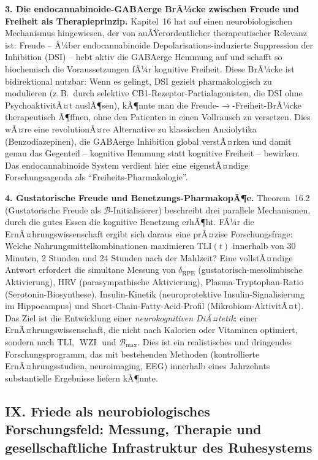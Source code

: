 ﻿\documentclass[12pt,a4paper]{report}
\theoremstyle{plain}
\theoremstyle{definition}
\theoremstyle{remark}
\DeclareMathOperator{\WZI}{WZI}
\begin{document}
	\textbf{3. Die endocannabinoide-GABAerge BrÃ¼cke zwischen Freude und Freiheit
		als Therapieprinzip.}
	Kapitel~16 hat auf einen neurobiologischen Mechanismus hingewiesen,
	der von auÃŸerordentlicher therapeutischer Relevanz ist:
	Freude -- Ã¼ber endocannabinoide Depolarisations-induzierte
	Suppression der Inhibition (DSI) -- hebt aktiv die GABAerge
	Hemmung auf und schafft so biochemisch die Voraussetzungen
	fÃ¼r kognitive Freiheit.
	Diese BrÃ¼cke ist bidirektional nutzbar: Wenn es gelingt, DSI
	gezielt pharmakologisch zu modulieren (z.\,B.\ durch selektive
	CB1-Rezeptor-Partialagonisten, die DSI ohne PsychoaktivitÃ¤t
	auslÃ¶sen), kÃ¶nnte man die Freude-$\to$-Freiheit-BrÃ¼cke
	therapeutisch Ã¶ffnen, ohne den Patienten in einen
	Vollrausch zu versetzen.
	Dies wÃ¤re eine revolutionÃ¤re Alternative zu klassischen Anxiolytika
	(Benzodiazepinen), die GABAerge Inhibition global verstÃ¤rken
	und damit genau das Gegenteil -- kognitive Hemmung statt
	kognitive Freiheit -- bewirken.
	Das endocannabinoide System verdient hier eine eigenstÃ¤ndige
	Forschungsagenda als ``Freiheits-Pharmakologie''.

	\textbf{4. Gustatorische Freude und Benetzungs-PharmakopÃ¶e.}
	Theorem~16.2 (Gustatorische Freude als $\mathcal{B}$-Initialisierer)
	beschreibt drei parallele Mechanismen, durch die gutes Essen
	die kognitive Benetzung erhÃ¶ht.
	FÃ¼r die ErnÃ¤hrungswissenschaft ergibt sich daraus eine
	prÃ¤zise Forschungsfrage: Welche Nahrungsmittelkombinationen
	maximieren $\mathrm{TLI}(t)$ innerhalb von 30 Minuten,
	2 Stunden und 24 Stunden nach der Mahlzeit?
	Eine vollstÃ¤ndige Antwort erfordert die simultane Messung von
	$\delta_{\mathrm{RPE}}$ (gustatorisch-mesolimbische Aktivierung),
	HRV (parasympathische Aktivierung), Plasma-Tryptophan-Ratio
	(Serotonin-Biosynthese), Insulin-Kinetik (neuroprotektive
	Insulin-Signalisierung im Hippocampus) und Short-Chain-Fatty-Acid-Profil
	(Mikrobiom-AktivitÃ¤t).
	Das Ziel ist die Entwicklung einer \emph{neurokognitiven DiÃ¤tetik}:
	einer ErnÃ¤hrungswissenschaft, die nicht nach Kalorien oder
	Vitaminen optimiert, sondern nach $\mathrm{TLI}$, $\WZI$ und
	$\mathcal{B}_{\max}$.
	Dies ist ein realistisches und dringendes Forschungsprogramm,
	das mit bestehenden Methoden (kontrollierte ErnÃ¤hrungsstudien,
	neuroimaging, EEG) innerhalb eines Jahrzehnts substantielle
	Ergebnisse liefern kÃ¶nnte.

	\subsection*{IX. Friede als neurobiologisches Forschungsfeld:
		Messung, Therapie und gesellschaftliche Infrastruktur des Ruhesystems}
\end{document}
